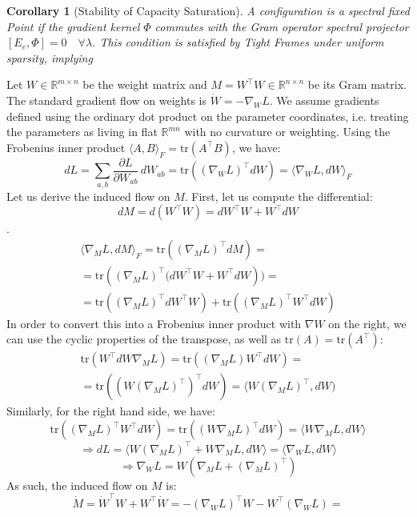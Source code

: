 \documentclass{article}
\theoremstyle{plain}
\newtheorem{corollary}[theorem]{Corollary}
\numberwithin{equation}{section}
\theoremstyle{definition}
\theoremstyle{remark}
\begin{document}
\begin{corollary}[Stability of Capacity Saturation] A configuration is a spectral fixed Point if the gradient kernel $\Phi$ commutes with the Gram operator spectral projector $[E_e, \Phi] = 0 \quad \forall \lambda$. This condition is satisfied by Tight Frames under uniform sparsity, implying 
\end{corollary}






\label{appendix:gradient_flow}
Let $W\in \mathbb{R}^{m\times n}$ be the weight matrix and $M = W^\top W\in \mathbb{R}^{n\times n}$ be its Gram matrix. The standard gradient flow on weights is $\dot W = - \nabla_W L$. We assume gradients defined using the ordinary dot product on the parameter coordinates, i.e. treating the parameters as living in flat $\mathbb{R}^{mn}$
 with no curvature or weighting. Using the Frobenius inner product $\langle A, B\rangle_F = \text{tr}(A^\top B)$, we have: $$dL = \sum_{a,b} \frac{\partial L}{\partial W_{ab}}\, dW_{ab} = \text{tr}\left((\nabla_W L)^\top dW\right) =\langle \nabla_W L, dW\rangle_F$$
Let us derive the induced flow on $M$. First, let us compute the differential:$$dM = d(W^\top W) = dW^\top W + W^\top dW$$. 
\begin{align*}\langle \nabla_M L, dM\rangle_F = \text{tr}\left((\nabla_M L)^\top dM\right)= \\=\text{tr}\left((\nabla_ML)^\top (dW^\top W+W^\top dW\right))=\\=\text{tr}\left((\nabla_ML)^\top dW^\top W\right) + \text{tr}\left((\nabla_ML)^\top W^\top dW\right)\end{align*}
In order to convert this into a Frobenius inner product with $\nabla W$ on the right, we can use the cyclic properties of the transpose, as well as $\text{tr}(A) = \text{tr}(A^\top)$:
\begin{align*}\text{tr}\left(W^\top dW\nabla_ML\right) = \text{tr}((\nabla_ML)W^\top dW) =\\= \text{tr}((W(\nabla_ML)^\top)^\top dW) = \langle W(\nabla_ML)^\top , dW)\end{align*}
Similarly, for the right hand side, we have: $$\text{tr}((\nabla_ML)^\top W^\top dW) = \text{tr}((W\nabla_ML)^\top dW) = \langle W\nabla_M L, dW\rangle$$$$\Rightarrow dL = \langle W(\nabla_ML)^\top + W\nabla_M L, dW\rangle = \langle \nabla_W L, dW\rangle$$$$\Rightarrow \nabla_WL =  W\left(\nabla_ML+ (\nabla_ML)^\top\right)$$  As such, the induced flow on $M$ is: $$\dot{M} = \dot{W}^\top W + W^\top \dot W = -\left(\nabla_W L\right)^\top W - W^\top (\nabla_W L) = $$
\end{document}
